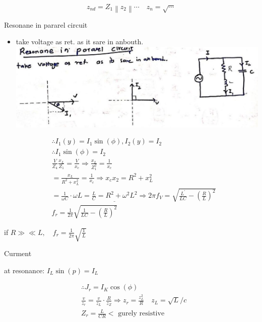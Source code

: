 \documentclass[12pt, a4paper]{article}
\begin{document}
	$$
		z_{n d}=Z_{1}\left\|z_{2}\right\| \cdots \quad z_{n}=\sqrt{\cdots}
	$$

	Resonane in pararel circuit

	\begin{itemize}
		\item take voltage as ret. as it sare in anbouth.\\
		      \includegraphics[max width=\textwidth, center]{2024_06_15_74bbabba7981675b0d49g-10(3)}
	\end{itemize}

	$$
		\begin{aligned}
			 & \therefore I_{1}(y)=I_{1} \sin (\phi), I_{2}(y)=I_{2}                                                                                                                \\
			 & \therefore I_{1} \sin (\phi)=I_{2}                                                                                                                                   \\
			 & \frac{V}{Z_{4}} \frac{x_{L}}{Z_{1}}=\frac{V}{x_{c}} \Rightarrow \frac{x_{L}}{Z_{1}^{2}}=\frac{1}{x_{c}}                                                              \\
			 & =\frac{x_{L}}{R^{2}+x_{L}^{2}}=\frac{1}{x_{c}} \Rightarrow x_{c} x_{2}=R^{2}+x_{L}^{2}                                                                               \\
			 & =\frac{1}{\omega C} \cdot \omega L=\underline{\frac{L}{C}=R^{2}+\omega^{2} L^{2}} \Rightarrow 2 \pi f_{V}=\sqrt{\frac{L^{\prime}}{L C}-\left(\frac{R}{L}\right)^{2}} \\
			 & f_{r}=\frac{1}{2 \pi} \sqrt{\frac{1}{L C}-\left(\frac{R}{L}\right)^{2}}
		\end{aligned}
	$$

	if $R \gg \ll L, \quad f_{r}=\frac{1}{2 \pi} \sqrt{\frac{1}{L}}$

	Curment

	at resonance: $I_{L} \sin (p)=I_{L}$

	$$
		\begin{aligned}
			 & \therefore J_{r}=I_{K} \cos (\phi)                                                                                   \\
			 & \frac{v}{z_{r}}=\frac{v}{z_{L}} \cdot \frac{R}{z_{Z}} \Rightarrow z_{r}=\frac{z_{L}^{2}}{R} \quad z_{L}=\sqrt{L} / c \\
			 & Z_{r}=\frac{L}{C R}<\text { gurely resistive }
		\end{aligned}
	$$
\end{document}
